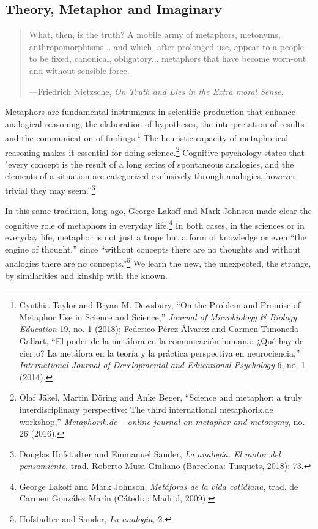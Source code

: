 \documentclass{tufte-handout}
\begin{document}
\hypertarget{theory-metaphor-and-imaginary}{%
\subsection{Theory, Metaphor and
Imaginary}\label{theory-metaphor-and-imaginary}}

\begin{quote}
What, then, is the truth? A mobile army of metaphors, metonyms,
anthropomorphisms... and which, after prolonged use, appear to a people
to be fixed, canonical, obligatory... metaphors that have become
worn-out and without sensible force.

---Friedrich Nietzsche, \emph{On Truth and Lies in the Extra moral
Sense}.
\end{quote}

Metaphors are fundamental instruments in scientific production that
enhance analogical reasoning, the elaboration of hypotheses, the
interpretation of results and the communication of findings.\footnote{Cynthia
  Taylor and Bryan M. Dewsbury, ``On the Problem and Promise of Metaphor
  Use in Science and Science,'' \emph{Journal of Microbiology \& Biology
  Education} 19, no. 1 (2018); Federico Pérez Álvarez and Carmen
  Timoneda Gallart, ``El poder de la metáfora en la comunicación humana:
  ¿Qué hay de cierto? La metáfora en la teoría y la práctica perspectiva
  en neurociencia,'' \emph{International Journal of Developmental and
  Educational Psychology} 6, no. 1 (2014).} The heuristic capacity of
metaphorical reasoning makes it essential for doing science.\footnote{Olaf
  Jäkel, Martin Döring and Anke Beger, ``Science and metaphor: a truly
  interdisciplinary perspective: The third international metaphorik.de
  workshop,'' \emph{Metaphorik.de -- online journal on metaphor and
  metonymy}, no. 26 (2016).} Cognitive psychology states that "every
concept is the result of a long series of spontaneous analogies, and the
elements of a situation are categorized exclusively through analogies,
however trivial they may seem.''\footnote{Douglas Hofstadter and
  Emmanuel Sander, \emph{La analogía. El motor del pensamiento}, trad.
  Roberto Musa Giuliano (Barcelona: Tusquets, 2018): 73.}

In this same tradition, long ago, George Lakoff and Mark Johnson made
clear the cognitive role of metaphors in everyday life.\footnote{George
  Lakoff and Mark Johnson, \emph{Metáforas de la vida cotidiana}, trad.
  de Carmen González Marín (Cátedra: Madrid, 2009).} In both cases, in
the sciences or in everyday life, metaphor is not just a trope but a
form of knowledge or even ``the engine of thought,'' since ``without
concepts there are no thoughts and without analogies there are no
concepts.''\footnote{Hofstadter and Sander, \emph{La analogía,} 2.} We
learn the new, the unexpected, the strange, by similarities and kinship
with the known.
\end{document}
